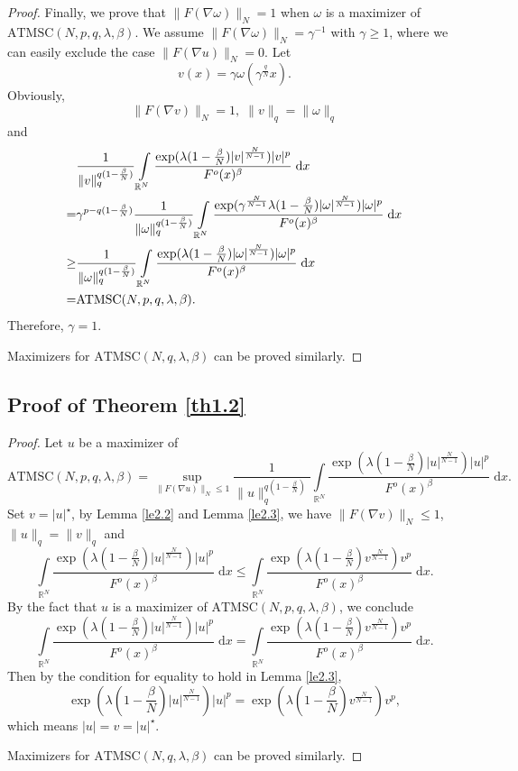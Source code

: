\documentclass[11pt]{article}
\theoremstyle{plain}
\numberwithin{equation}{section}
\newcommand{\R}{\mathbb{R}}
\begin{document}
\begin{proof}
Finally, we prove that $\|F(\nabla\omega)\|_{N}=1$ when $\omega$ is a maximizer of $\mathrm{ATMSC}(N,p,q,\lambda,\beta)$. We assume $\|F(\nabla\omega)\|_{N}=\gamma^{-1}$ with $\gamma\geq1$, where we can easily exclude the case $\|F(\nabla u)\|_{N}=0$. Let
$$
v(x)=\gamma\omega(\gamma^{\frac{q}{N}}x).
$$
Obviously,
$$
\|F(\nabla v)\|_{N}=1,\;\|v\|_{q}=\|\omega\|_{q}
$$
and
\begin{align}
    &\frac{1}{\|v\|_{q}^{q(1-\frac{\beta}{N})}}\int\limits_{\R^{N}}\frac{\exp(\lambda(1-\frac{\beta}{N})\lvert v\rvert^{\frac{N}{N-1}})\lvert v\rvert^{p}}{F^{o}(x)^{\beta}}\;\mathrm{d}x\notag\\
    =&\gamma^{p-q(1-\frac{\beta}{N})}\frac{1}{\|\omega\|_{q}^{q(1-\frac{\beta}{N})}}\int\limits_{\R^{N}}\frac{\exp(\gamma^{\frac{N}{N-1}}\lambda(1-\frac{\beta}{N})\lvert \omega\rvert^{\frac{N}{N-1}})\lvert \omega\rvert^{p}}{F^{o}(x)^{\beta}}\;\mathrm{d}x\notag\\
    \geq&\frac{1}{\|\omega\|_{q}^{q(1-\frac{\beta}{N})}}\int\limits_{\R^{N}}\frac{\exp(\lambda(1-\frac{\beta}{N})\lvert \omega\rvert^{\frac{N}{N-1}})\lvert \omega\rvert^{p}}{F^{o}(x)^{\beta}}\;\mathrm{d}x\notag\\
    =&\mathrm{ATMSC}(N,p,q,\lambda,\beta)\notag.
\end{align}
Therefore, $\gamma=1$.

Maximizers for $\mathrm{ATMSC}(N,q,\lambda,\beta)$ can be proved similarly.
\end{proof}
\subsection{Proof of Theorem \ref{th1.2}}
\begin{proof}
Let $u$ be a maximizer of
$$
\mathrm{ATMSC}(N,p,q,\lambda,\beta)=\sup\limits_{\|F(\nabla u)\|_{N}\leq 1}\frac{1}{\|u\|_{q}^{q(1-\frac{\beta}{N})}}\int\limits_{\R^{N}}\frac{\exp(\lambda(1-\frac{\beta}{N})\lvert u\rvert^{\frac{N}{N-1}})\lvert u\rvert^{p}}{F^{o}(x)^{\beta}}\;\mathrm{d}x.
$$
Set $v=\lvert u\rvert^{\star}$, by Lemma \ref{le2.2} and Lemma \ref{le2.3}, we have $\|F(\nabla v)\|_{N}\leq1$, $\|u\|_{q}=\|v\|_{q}$ and
$$
\int\limits_{\R^{N}}\frac{\exp(\lambda(1-\frac{\beta}{N})\lvert u\rvert^{\frac{N}{N-1}})\lvert u\rvert^{p}}{F^{o}(x)^{\beta}}\;\mathrm{d}x\leq\int\limits_{\R^{N}}\frac{\exp(\lambda(1-\frac{\beta}{N})v^{\frac{N}{N-1}})v^{p}}{F^{o}(x)^{\beta}}\;\mathrm{d}x.
$$
By the fact that $u$ is a maximizer of $\mathrm{ATMSC}(N,p,q,\lambda,\beta)$, we conclude
$$
\int\limits_{\R^{N}}\frac{\exp(\lambda(1-\frac{\beta}{N})\lvert u\rvert^{\frac{N}{N-1}})\lvert u\rvert^{p}}{F^{o}(x)^{\beta}}\;\mathrm{d}x=\int\limits_{\R^{N}}\frac{\exp(\lambda(1-\frac{\beta}{N})v^{\frac{N}{N-1}})v^{p}}{F^{o}(x)^{\beta}}\;\mathrm{d}x.
$$
Then by the condition for equality to hold in Lemma \ref{le2.3},
$$
\exp(\lambda(1-\frac{\beta}{N})\lvert u\rvert^{\frac{N}{N-1}})\lvert u\rvert^{p}=\exp(\lambda(1-\frac{\beta}{N})v^{\frac{N}{N-1}})v^{p},
$$
which means $\lvert u\rvert=v=\lvert u\rvert^{\star}$.

Maximizers for $\mathrm{ATMSC}(N,q,\lambda,\beta)$ can be proved similarly.
\end{proof}
\end{document}
